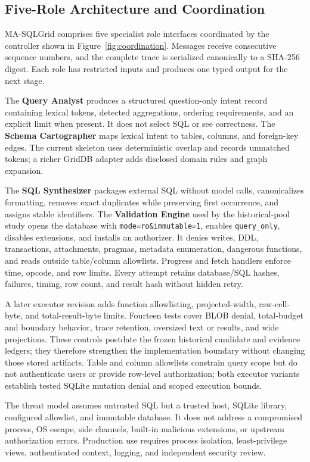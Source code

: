 \documentclass[applsci,article,submit,moreauthors]{Definitions/mdpi}
\newcommand{\masql}{MA-SQLGrid}
\begin{document}
\subsection{Five-Role Architecture and Coordination}

\masql{} comprises five specialist role interfaces coordinated by the controller shown in Figure~\ref{fig:coordination}. Messages receive consecutive sequence numbers, and the complete trace is serialized canonically to a SHA-256 digest. Each role has restricted inputs and produces one typed output for the next stage.

The \textbf{Query Analyst} produces a structured question-only intent record containing lexical tokens, detected aggregations, ordering requirements, and an explicit limit when present. It does not select SQL or see correctness. The \textbf{Schema Cartographer} maps lexical intent to tables, columns, and foreign-key edges. The current skeleton uses deterministic overlap and records unmatched tokens; a richer GridDB adapter adds disclosed domain rules and graph expansion.

The \textbf{SQL Synthesizer} packages external SQL without model calls, canonicalizes formatting, removes exact duplicates while preserving first occurrence, and assigns stable identifiers. The \textbf{Validation Engine} used by the historical-pool study opens the database with \texttt{mode=ro\&immutable=1}, enables \texttt{query\_only}, disables extensions, and installs an authorizer. It denies writes, DDL, transactions, attachments, pragmas, metadata enumeration, dangerous functions, and reads outside table/column allowlists. Progress and fetch handlers enforce time, opcode, and row limits. Every attempt retains database/SQL hashes, failures, timing, row count, and result hash without hidden retry.

A later executor revision adds function allowlisting, projected-width, raw-cell-byte, and total-result-byte limits. Fourteen tests cover BLOB denial, total-budget and boundary behavior, trace retention, oversized text or results, and wide projections. These controls postdate the frozen historical candidate and evidence ledgers; they therefore strengthen the implementation boundary without changing those stored artifacts. Table and column allowlists constrain query scope but do not authenticate users or provide row-level authorization; both executor variants establish tested SQLite mutation denial and scoped execution bounds.

The threat model assumes untrusted SQL but a trusted host, SQLite library, configured allowlist, and immutable database. It does not address a compromised process, OS escape, side channels, built-in malicious extensions, or upstream authorization errors. Production use requires process isolation, least-privilege views, authenticated context, logging, and independent security review.
\end{document}
